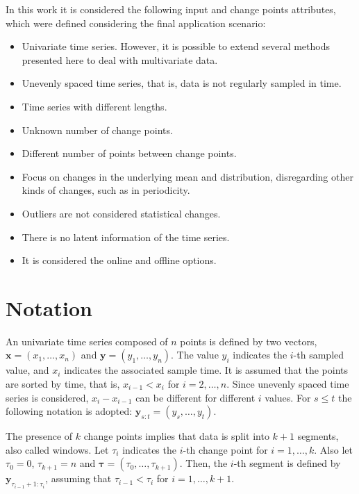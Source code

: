 In this work it is considered the following input and change points attributes, which were defined considering the final application scenario:
\begin{itemize}
    \item Univariate time series. However, it is possible to extend several methods presented here to deal with multivariate data.
    \item Unevenly spaced time series, that is, data is not regularly sampled in time.
    \item Time series with different lengths.
    \item Unknown number of change points.
    \item Different number of points between change points.
    \item Focus on changes in the underlying mean and distribution, disregarding other kinds of changes, such as in periodicity.
    \item Outliers are not considered statistical changes.
    \item There is no latent information of the time series.
    \item It is considered the online and offline options.
\end{itemize}

\section{Notation}

An univariate time series composed of $n$ points is defined by two vectors, $\mathbf{x} = (x_{1}, \ldots, x_{n})$ and $\mathbf{y} = (y_{1}, \ldots, y_{n})$. The value $y_{i}$ indicates the $i$-th sampled value, and $x_{i}$ indicates the associated sample time. It is assumed that the points are sorted by time, that is, $x_{i - 1} < x_{i}$ for $i = 2, \ldots, n$. Since unevenly spaced time series is considered, $x_{i} - x_{i - 1}$ can be different for different $i$ values. For $s \le t$ the following notation is adopted: $\mathbf{y}_{s:t} = (y_{s}, \ldots, y_{t})$.

The presence of $k$ change points implies that data is split into $k+1$ segments, also called windows. Let $\tau_{i}$ indicates the $i$-th change point for $i=1, \ldots, k$. Also let $\tau_{0} = 0$, $\tau_{k + 1} = n$ and $\boldsymbol \tau = (\tau_{0}, \ldots, \tau_{k + 1})$. Then, the $i$-th segment is defined by $\mathbf{y}_{\tau_{i - 1} + 1 : \tau_{i}}$, assuming that $\tau_{i - 1} < \tau_{i}$ for $i = 1, \ldots, k + 1$.

